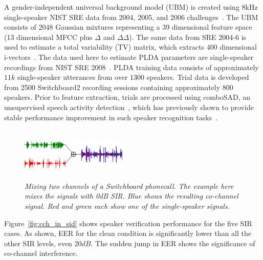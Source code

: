 \documentclass[journal]{IEEEtran}
\begin{document}
A gender-independent universal background model (UBM) is created using 8kHz single-speaker NIST SRE data from 2004, 2005, and 2006 challenges~\cite{NIST04,NIST05,NIST06}. 
The UBM consists of $2048$ Gaussian mixtures representing a 39 dimensional feature space (13 dimensional MFCC plus $\Delta$ and $\Delta\Delta$). 
The same data from SRE 2004-6 is used to estimate a total variability (TV) matrix, which extracts $400$ dimensional i-vectors~\cite{Dehak_ivector}. 
The data used here to estimate PLDA parameters are single-speaker recordings from NIST SRE 2008~\cite{NIST08}. 
PLDA training data consists of approximately $11k$ single-speaker utterances from over $1300$ speakers. 
Trial data is developed from 2500 Switchboard2 recording sessions containing approximately $800$ speakers. 
Prior to feature extraction, trials are processed using comboSAD, an unsupervised speech activity detection~\cite{sadjadi2013unsupervised}, which has previously shown to provide stable performance improvement in such speaker recognition tasks~\cite{hasan2013crss}. 

\begin{figure}[t!]
	\vspace{-1mm}
	\hspace{3mm}
	\includegraphics[height = 1.0in, width=0.45\textwidth]{figures/swb_cch_demo-crop}
	\vspace{-1mm}
	\caption{\it \small Mixing two channels of a Switchboard phonecall. The example here mixes the signals with 0dB SIR. Blue shows the resulting co-channel signal. Red and green each show one of the single-speaker signals.}
	\label{fig:mix_swb}
	\vspace{-1mm}
\end{figure}

Figure~\ref{fig:cch_in_sid} shows speaker verification performance for the five SIR cases. 
As shown, EER for the clean condition is significantly lower than all the other SIR levels, even $20dB$. 
The sudden jump in EER shows the significance of co-channel interference. 
\end{document}
